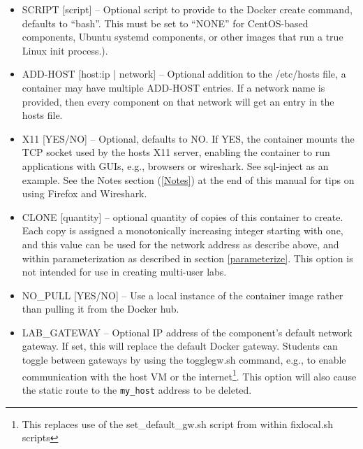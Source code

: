 \documentclass[12pt]{article}
\begin{document}
\begin{itemize}
\begin{itemize}
\begin{itemize}
those of the host network interface.  When stated as a multi-user lab with all containers on one VM, e.g., the 
{\tt --client\_count} switch, then the allocated IP address is incremeted by one less than the clone instance number.
\item If {\tt AUTO} is provided as the address, an address is chosen for you from the subnet range.  
\end{itemize}
Multiple IP addresses per network interface by appending a {\tt :n} to the {\tt network name}, e.g., 
\begin{verbatim}
         MY_LAN:1 172.24.0.3
         MY_LAN:2 172.24.0.4
\end{verbatim}
\item SCRIPT [script] -- Optional script to provide to the Docker create command, defaults to ``bash''.  This must be set to
``NONE'' for CentOS-based components, Ubuntu systemd components, or other images that run a true Linux init process.).
\item ADD-HOST [host:ip | network] -- Optional addition to the /etc/hosts file, a container may have multiple ADD-HOST entries.
If a network name is provided, then every component on that network will get an entry in the hosts file.
\item X11 [YES/NO] -- Optional, defaults to NO.  If YES, the container mounts the TCP socket used by the hosts X11 server,
enabling the container to run applications with GUIs, e.g., browsers or wireshark.  See sql-inject as an example.  See the
Notes section (\ref{Notes}) at the end of this manual for tips on using Firefox and Wireshark.
\item CLONE [quantity] -- optional quantity of copies of this container to create. Each copy is assigned a monotonically
increasing integer starting with one, and this value can be used for the network address as describe above, and within
parameterization as described in section \ref{parameterize}. This option is not intended for use in creating multi-user
labs.
\item NO\_PULL [YES/NO] -- Use a local instance of the container image rather than pulling it from the Docker hub.
\item LAB\_GATEWAY -- Optional IP address of the component's default network gateway.   If set, this will replace the
default Docker gateway.  Students can toggle between gateways by using the togglegw.sh command, e.g., to enable communication
with the host VM or the internet\footnote{This replaces use of the set\_default\_gw.sh script from 
within fixlocal.sh scripts}.  This option will also cause the static route to the {\tt my\_host} address to be deleted.

\end{itemize}
\end{itemize}
\end{document}
